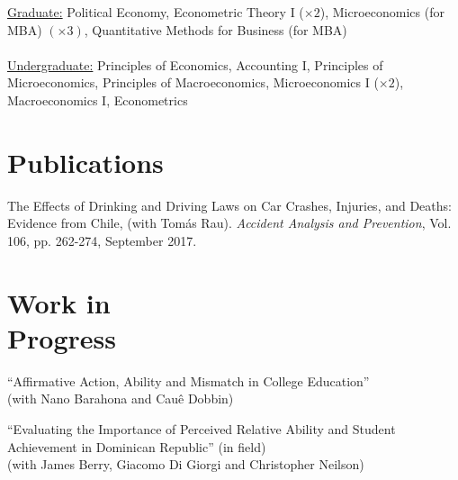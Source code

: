 \documentclass[margin,line]{res}
\begin{document}
\begin{resume}
\vspace{-.3cm}
\underline{Graduate:} Political Economy, Econometric Theory I ($\times 2$),  Microeconomics (for MBA) $(\times3)$, Quantitative Methods for Business (for MBA)\\
\vspace{-.2cm}
\\
\underline{Undergraduate:} Principles of Economics, Accounting I, Principles of Microeconomics,  Principles of Macroeconomics, Microeconomics I ($\times 2$), Macroeconomics I, Econometrics\\




\section{\sc Publications}
The Effects of Drinking and Driving Laws on Car Crashes, Injuries, and Deaths: Evidence from Chile, (with Tom\'as Rau). {\it Accident Analysis and Prevention}, Vol. 106, pp. 262-274, September 2017.    
 
\section{\sc Work in \\Progress}

``Affirmative Action, Ability and Mismatch in College Education'' \\
(with Nano Barahona and Cau\^e Dobbin)

``Evaluating the Importance of Perceived Relative Ability and Student Achievement in Dominican Republic''  (in field)\\
(with James Berry, Giacomo Di Giorgi and Christopher Neilson)


\end{resume}
\end{document}
